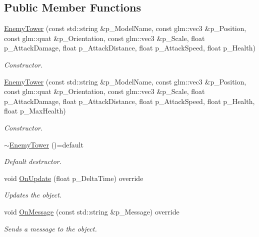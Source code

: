 \subsection*{Public Member Functions}
\begin{DoxyCompactItemize}
\item 
\mbox{\hyperlink{class_enemy_tower_ace06a9d69e04e93e30fe87a2b36ba282}{Enemy\+Tower}} (const std\+::string \&p\+\_\+\+Model\+Name, const glm\+::vec3 \&p\+\_\+\+Position, const glm\+::quat \&p\+\_\+\+Orientation, const glm\+::vec3 \&p\+\_\+\+Scale, float p\+\_\+\+Attack\+Damage, float p\+\_\+\+Attack\+Distance, float p\+\_\+\+Attack\+Speed, float p\+\_\+\+Health)
\begin{DoxyCompactList}\small\item\em Constructor. \end{DoxyCompactList}\item 
\mbox{\hyperlink{class_enemy_tower_a50073b5c1051a738e9242490f25dce1f}{Enemy\+Tower}} (const std\+::string \&p\+\_\+\+Model\+Name, const glm\+::vec3 \&p\+\_\+\+Position, const glm\+::quat \&p\+\_\+\+Orientation, const glm\+::vec3 \&p\+\_\+\+Scale, float p\+\_\+\+Attack\+Damage, float p\+\_\+\+Attack\+Distance, float p\+\_\+\+Attack\+Speed, float p\+\_\+\+Health, float p\+\_\+\+Max\+Health)
\begin{DoxyCompactList}\small\item\em Constructor. \end{DoxyCompactList}\item 
\mbox{\label{class_enemy_tower_aa760afd4281ec3ba80969c09128568e8}} 
\mbox{\hyperlink{class_enemy_tower_aa760afd4281ec3ba80969c09128568e8}{$\sim$\+Enemy\+Tower}} ()=default
\begin{DoxyCompactList}\small\item\em Default destructor. \end{DoxyCompactList}\item 
void \mbox{\hyperlink{class_enemy_tower_ab3ada6dea5a4020a48c2764315767aec}{On\+Update}} (float p\+\_\+\+Delta\+Time) override
\begin{DoxyCompactList}\small\item\em Updates the object. \end{DoxyCompactList}\item 
void \mbox{\hyperlink{class_enemy_tower_aa717457559bfba3b6e9f932d71c97831}{On\+Message}} (const std\+::string \&p\+\_\+\+Message) override
\begin{DoxyCompactList}\small\item\em Sends a message to the object. \end{DoxyCompactList}\end{DoxyCompactItemize}
